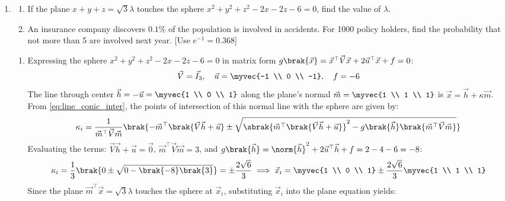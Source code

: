 \begin{enumerate}[label=\thesubsection.\arabic*, ref=\thesubsection.\theenumi]
	\item \hfill {}
	\begin{enumerate}[label=\brak{\alph*}]
		\item If the plane $x + y + z = \sqrt{3}\lambda$ touches the sphere $x^2 + y^2 + z^2 - 2x - 2z - 6 = 0$, find the value of $\lambda$.
		\item An insurance company discovers $0.1\%$ of the population is involved in accidents. For 1000 policy holders, find the probability that not more than 5 are involved next year. [Use $e^{-1} = 0.368$]
	\end{enumerate}
	\solution
	\begin{enumerate}[label=\brak{\alph*}]
		\item Expressing the sphere $x^2 + y^2 + z^2 - 2x - 2z - 6 = 0$ in matrix form $g\brak{\vec{x}} = \vec{x}^{\top}\vec{V}\vec{x} + 2\vec{u}^{\top}\vec{x} + f = 0$:
		\begin{align}
			\vec{V} = \vec{I}_3, \quad \vec{u} = \myvec{-1 \\ 0 \\ -1}, \quad f = -6
		\end{align}
		The line through center $\vec{h} = -\vec{u} = \myvec{1 \\ 0 \\ 1}$ along the plane's normal $\vec{m} = \myvec{1 \\ 1 \\ 1}$ is $\vec{x} = \vec{h} + \kappa\vec{m}$. From \eqref{eq:line_conic_inter}, the points of intersection of this normal line with the sphere are given by:
		\begin{align}
			\kappa_i = \frac{1}{\vec{m}^{\top}\vec{V}\vec{m}}\brak{-\vec{m}^{\top}\brak{\vec{V}\vec{h} + \vec{u}} \pm \sqrt{\sbrak{\vec{m}^{\top}\brak{\vec{V}\vec{h} + \vec{u}}}^2 - g\brak{\vec{h}}\brak{\vec{m}^{\top}\vec{V}\vec{m}}}}
		\end{align}
		Evaluating the terms: $\vec{V}\vec{h} + \vec{u} = \vec{0}$, $\vec{m}^{\top}\vec{V}\vec{m} = 3$, and $g\brak{\vec{h}} = \norm{\vec{h}}^2 + 2\vec{u}^{\top}\vec{h} + f = 2 - 4 - 6 = -8$:
		\begin{align}
			\kappa_i = \frac{1}{3}\brak{0 \pm \sqrt{0 - \brak{-8}\brak{3}}} = \pm\frac{2\sqrt{6}}{3} \implies \vec{x}_i = \myvec{1 \\ 0 \\ 1} \pm \frac{2\sqrt{6}}{3}\myvec{1 \\ 1 \\ 1}
		\end{align}
		Since the plane $\vec{m}^{\top}\vec{x} = \sqrt{3}\lambda$ touches the sphere at $\vec{x}_i$, substituting $\vec{x}_i$ into the plane equation yields:

\end{enumerate}
\end{enumerate}
